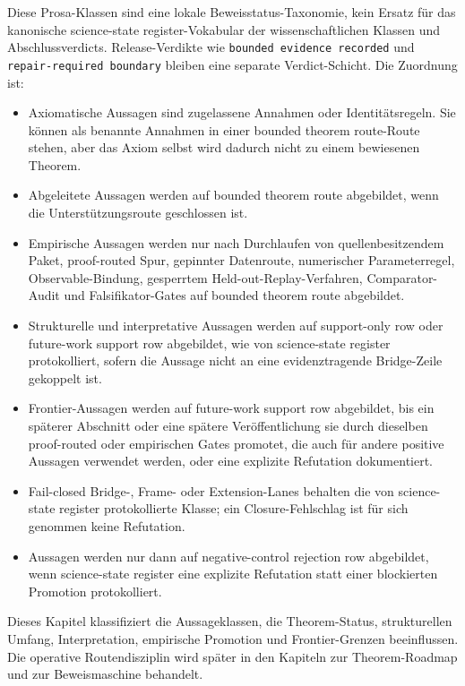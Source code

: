 Diese Prosa-Klassen sind eine lokale Beweisstatus-Taxonomie, kein Ersatz für
das kanonische science-state register-Vokabular der wissenschaftlichen Klassen und
Abschlussverdicts. Release-Verdikte wie \texttt{bounded evidence recorded} und
\texttt{repair-required boundary} bleiben eine separate Verdict-Schicht. Die Zuordnung ist:
\begin{itemize}
\item Axiomatische Aussagen sind zugelassene Annahmen oder Identitätsregeln.
      Sie können als benannte Annahmen in einer bounded theorem route-Route
      stehen, aber das Axiom selbst wird dadurch nicht zu einem bewiesenen
      Theorem.
\item Abgeleitete Aussagen werden auf bounded theorem route abgebildet,
      wenn die Unterstützungsroute geschlossen ist.
\item Empirische Aussagen werden nur nach Durchlaufen von quellenbesitzendem
      Paket, proof-routed Spur, gepinnter Datenroute, numerischer
      Parameterregel, Observable-Bindung, gesperrtem Held-out-Replay-Verfahren,
      Comparator-Audit und Falsifikator-Gates auf bounded theorem route
      abgebildet.
\item Strukturelle und interpretative Aussagen werden auf support-only row
      oder future-work support row abgebildet, wie von science-state register protokolliert, sofern
      die Aussage nicht an eine evidenztragende Bridge-Zeile gekoppelt ist.
\item Frontier-Aussagen werden auf future-work support row abgebildet, bis ein
      späterer Abschnitt oder eine spätere Veröffentlichung sie durch dieselben
      proof-routed oder empirischen Gates promotet, die auch für andere
      positive Aussagen verwendet werden, oder eine explizite Refutation
      dokumentiert.
\item Fail-closed Bridge-, Frame- oder Extension-Lanes behalten die von science-state register
      protokollierte Klasse; ein Closure-Fehlschlag ist für sich genommen keine
      Refutation.
\item Aussagen werden nur dann auf negative-control rejection row abgebildet, wenn science-state register eine
      explizite Refutation statt einer blockierten Promotion protokolliert.
\end{itemize}
Dieses Kapitel klassifiziert die Aussageklassen, die Theorem-Status,
strukturellen Umfang, Interpretation, empirische Promotion und Frontier-Grenzen
beeinflussen. Die operative Routendisziplin wird später in den Kapiteln zur
Theorem-Roadmap und zur Beweismaschine behandelt.

